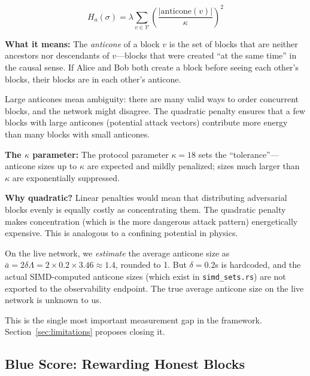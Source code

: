 \documentclass[11pt,a4paper]{article}
\begin{document}
\begin{blackboard}
\begin{equation}
H_a(\sigma) = \lambda \sum_{v \in \mathcal{V}} \left(\frac{|\mathrm{anticone}(v)|}{\kappa}\right)^2
\end{equation}

\textbf{What it means:} The \emph{anticone} of a block $v$ is the set of blocks that are neither ancestors nor descendants of $v$---blocks that were created ``at the same time'' in the causal sense. If Alice and Bob both create a block before seeing each other's blocks, their blocks are in each other's anticone.

Large anticones mean ambiguity: there are many valid ways to order concurrent blocks, and the network might disagree. The quadratic penalty ensures that a few blocks with large anticones (potential attack vectors) contribute more energy than many blocks with small anticones.

\textbf{The $\kappa$ parameter:} The protocol parameter $\kappa = 18$ sets the ``tolerance''---anticone sizes up to $\kappa$ are expected and mildly penalized; sizes much larger than $\kappa$ are exponentially suppressed.

\textbf{Why quadratic?} Linear penalties would mean that distributing adversarial blocks evenly is equally costly as concentrating them. The quadratic penalty makes concentration (which is the more dangerous attack pattern) energetically expensive. This is analogous to a confining potential in physics.
\end{blackboard}

\begin{honesty}
On the live network, we \emph{estimate} the average anticone size as $\bar{a} = 2\delta\Lambda = 2 \times 0.2 \times 3.46 \approx 1.4$, rounded to 1. But $\delta = 0.2$s is hardcoded, and the actual SIMD-computed anticone sizes (which exist in \texttt{simd\_sets.rs}) are not exported to the observability endpoint. The true average anticone size on the live network is unknown to us.

This is the single most important measurement gap in the framework. Section~\ref{sec:limitations} proposes closing it.
\end{honesty}

\subsection{Blue Score: Rewarding Honest Blocks}
\end{document}
